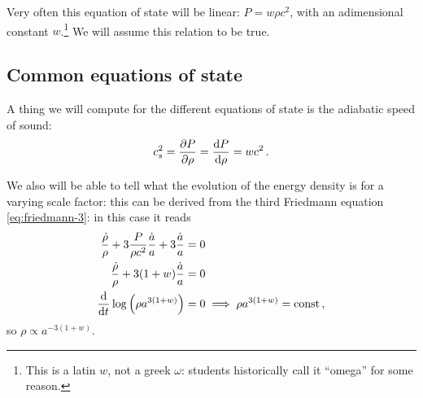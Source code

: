 \documentclass[main.tex]{subfiles}
\begin{document}
Very often this equation of state will be linear: \(P = w \rho c^2\), with an adimensional constant \(w\).\footnote{This is a latin \(w\), not a greek \(\omega \): students historically call it ``omega'' for some reason.}
We will assume this relation to be true.



\subsection{Common equations of state}

A thing we will compute for the different equations of state is the adiabatic speed of sound: 
%
\begin{align}
c^2_{s} = \pdv{P}{\rho } = \dv{P}{\rho } = w c^2
\,.
\end{align}

We also will be able to tell what the evolution of the energy density is for a varying scale factor:
this can be derived from the third Friedmann equation \eqref{eq:friedmann-3}: in this case it reads 
%
\begin{align}
\frac{\dot{\rho}}{\rho } + 3\frac{P}{\rho c^2} \frac{\dot{a}}{a} + 3 \frac{\dot{a}}{a}  &= 0   \\
\frac{\dot{\rho}}{\rho } + 3 (1+w) \frac{\dot{a}}{a} &= 0 \\
\dv{}{t} \log \qty(\rho a^{3(1+w)}) &=0 \implies \rho a^{3(1+w)} = \text{const}
\,,
\end{align}
%
so \(\rho \propto a^{-3(1+w)}\).
\end{document}
